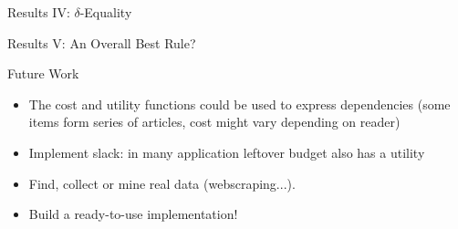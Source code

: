 \documentclass{beamer}
\begin{document}
\begin{frame}{Results IV: $\delta$-Equality}
	
\end{frame}

\begin{frame}{Results V: An Overall Best Rule?}
	
\end{frame}

\begin{frame}{Future Work}

\begin{itemize}
	\item The cost and utility functions could be used to express dependencies (some items form series of articles, cost might vary depending on reader)
	\item Implement slack: in many application leftover budget also has a utility
	\item Find, collect or mine real data (webscraping...).
	\item Build a ready-to-use implementation!
	
\end{itemize}
	
\end{frame}

\begin{frame}
	\tableofcontents
\end{frame}




%
%
\end{document}
